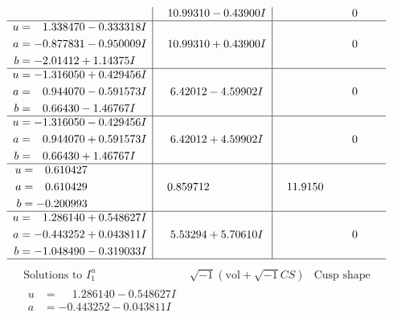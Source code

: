 \documentclass[1p]{elsarticle_modified}
\theoremstyle{definition}
\newcommand{\I}{\sqrt{-1}}
\begin{document}
$$\begin{array}{c|c|c}
 & \phantom{-}10.99310 - 0.43900 I & \phantom{-0.000000 } 0 \\ \hline\begin{aligned}
u &= \phantom{-}1.338470 - 0.333318 I \\
a &= -0.877831 - 0.950009 I \\
b &= -2.01412 + 1.14375 I\end{aligned}
 & \phantom{-}10.99310 + 0.43900 I & \phantom{-0.000000 } 0 \\ \hline\begin{aligned}
u &= -1.316050 + 0.429456 I \\
a &= \phantom{-}0.944070 - 0.591573 I \\
b &= \phantom{-}0.66430 - 1.46767 I\end{aligned}
 & \phantom{-}6.42012 - 4.59902 I & \phantom{-0.000000 } 0 \\ \hline\begin{aligned}
u &= -1.316050 - 0.429456 I \\
a &= \phantom{-}0.944070 + 0.591573 I \\
b &= \phantom{-}0.66430 + 1.46767 I\end{aligned}
 & \phantom{-}6.42012 + 4.59902 I & \phantom{-0.000000 } 0 \\ \hline\begin{aligned}
u &= \phantom{-}0.610427\phantom{ +0.000000I} \\
a &= \phantom{-}0.610429\phantom{ +0.000000I} \\
b &= -0.200993\phantom{ +0.000000I}\end{aligned}
 & \phantom{-}0.859712\phantom{ +0.000000I} & \phantom{-}11.9150\phantom{ +0.000000I} \\ \hline\begin{aligned}
u &= \phantom{-}1.286140 + 0.548627 I \\
a &= -0.443252 + 0.043811 I \\
b &= -1.048490 - 0.319033 I\end{aligned}
 & \phantom{-}5.53294 + 5.70610 I & \phantom{-0.000000 } 0\\
 \hline 
 \end{array}$$\newpage$$\begin{array}{c|c|c}  
\text{Solutions to }I^u_{1}& \I (\text{vol} + \sqrt{-1}CS) & \text{Cusp shape}\\
 \hline 
\begin{aligned}
u &= \phantom{-}1.286140 - 0.548627 I \\
a &= -0.443252 - 0.043811 I \\

\end{aligned}
\end{array}$$
\end{document}
